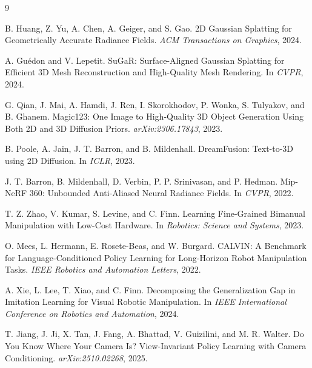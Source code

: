 \documentclass[letterpaper,times,10pt,twocolumn]{article}
\begin{document}
{\small
\begin{thebibliography}{9}

B. Huang, Z. Yu, A. Chen, A. Geiger, and S. Gao.
\newblock 2D Gaussian Splatting for Geometrically Accurate Radiance Fields.
\newblock \emph{ACM Transactions on Graphics}, 2024.

A. Gu\'edon and V. Lepetit.
\newblock SuGaR: Surface-Aligned Gaussian Splatting for Efficient 3D Mesh Reconstruction and High-Quality Mesh Rendering.
\newblock In \emph{CVPR}, 2024.

G. Qian, J. Mai, A. Hamdi, J. Ren, I. Skorokhodov, P. Wonka, S. Tulyakov, and B. Ghanem.
\newblock Magic123: One Image to High-Quality 3D Object Generation Using Both 2D and 3D Diffusion Priors.
\newblock \emph{arXiv:2306.17843}, 2023.

B. Poole, A. Jain, J. T. Barron, and B. Mildenhall.
\newblock DreamFusion: Text-to-3D using 2D Diffusion.
\newblock In \emph{ICLR}, 2023.

J. T. Barron, B. Mildenhall, D. Verbin, P. P. Srinivasan, and P. Hedman.
\newblock Mip-NeRF 360: Unbounded Anti-Aliased Neural Radiance Fields.
\newblock In \emph{CVPR}, 2022.

T. Z. Zhao, V. Kumar, S. Levine, and C. Finn.
\newblock Learning Fine-Grained Bimanual Manipulation with Low-Cost Hardware.
\newblock In \emph{Robotics: Science and Systems}, 2023.

O. Mees, L. Hermann, E. Rosete-Beas, and W. Burgard.
\newblock CALVIN: A Benchmark for Language-Conditioned Policy Learning for Long-Horizon Robot Manipulation Tasks.
\newblock \emph{IEEE Robotics and Automation Letters}, 2022.

A. Xie, L. Lee, T. Xiao, and C. Finn.
\newblock Decomposing the Generalization Gap in Imitation Learning for Visual Robotic Manipulation.
\newblock In \emph{IEEE International Conference on Robotics and Automation}, 2024.

T. Jiang, J. Ji, X. Tan, J. Fang, A. Bhattad, V. Guizilini, and M. R. Walter.
\newblock Do You Know Where Your Camera Is? View-Invariant Policy Learning with Camera Conditioning.
\newblock \emph{arXiv:2510.02268}, 2025.

\end{thebibliography}
}
\end{document}
